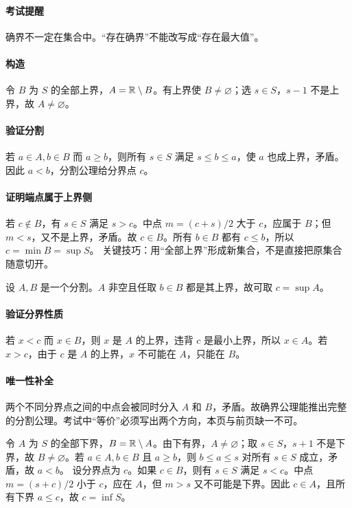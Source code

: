 \paragraph{考试提醒}确界不一定在集合中。“存在确界”不能改写成“存在最大值”。

\paragraph{构造}令 $B$ 为 $S$ 的全部上界，$A=\mathbb{R}\setminus B$。有上界使 $B\ne\varnothing$；选 $s\in S$，$s-1$ 不是上界，故 $A\ne\varnothing$。
\paragraph{验证分割}若 $a\in A,b\in B$ 而 $a\ge b$，则所有 $s\in S$ 满足 $s\le b\le a$，使 $a$ 也成上界，矛盾。因此 $a<b$，分割公理给分界点 $c$。
\paragraph{证明端点属于上界侧}若 $c\notin B$，有 $s\in S$ 满足 $s>c$。中点 $m=(c+s)/2$ 大于 $c$，应属于 $B$；但 $m<s$，又不是上界，矛盾。故 $c\in B$。所有 $b\in B$ 都有 $c\le b$，所以 $c=\min B=\sup S$。
关键技巧：用“全部上界”形成新集合，不是直接把原集合随意切开。

设 $A,B$ 是一个分割。$A$ 非空且任取 $b\in B$ 都是其上界，故可取 $c=\sup A$。
\paragraph{验证分界性质}若 $x<c$ 而 $x\in B$，则 $x$ 是 $A$ 的上界，违背 $c$ 是最小上界，所以 $x\in A$。若 $x>c$，由于 $c$ 是 $A$ 的上界，$x$ 不可能在 $A$，只能在 $B$。
\paragraph{唯一性补全}两个不同分界点之间的中点会被同时分入 $A$ 和 $B$，矛盾。故确界公理能推出完整的分割公理。考试中“等价”必须写出两个方向，本页与前页缺一不可。

令 $A$ 为 $S$ 的全部下界，$B=\mathbb{R}\setminus A$。由下有界，$A\ne\varnothing$；取 $s\in S$，$s+1$ 不是下界，故 $B\ne\varnothing$。若 $a\in A,b\in B$ 且 $a\ge b$，则 $b\le a\le s$ 对所有 $s\in S$ 成立，矛盾，故 $a<b$。
设分界点为 $c$。如果 $c\in B$，则有 $s\in S$ 满足 $s<c$。中点 $m=(s+c)/2$ 小于 $c$，应在 $A$，但 $m>s$ 又不可能是下界。因此 $c\in A$，且所有下界 $a\le c$，故 $c=\inf S$。
